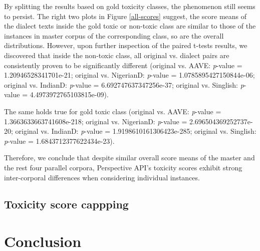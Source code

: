 \documentclass[11pt]{article}
\begin{document}
By splitting the results based on gold toxicity classes, the phenomenon still seems to persist. The right two plots in Figure \ref{all-scores} suggest, the score means of the dialect texts inside the gold toxic or non-toxic class are similar to those of the instances in master corpus of the corresponding class, so are the overall distributions. However, upon further inspection of the paired t-tests results, we discovered that inside the non-toxic class, all original vs. dialect pairs are consistently proven to be significantly different (original vs. AAVE: \textit{p}-value = 1.20946528341701e-21; original vs. NigerianD: \textit{p}-value = 1.0785895427150844e-06; original vs. IndianD: \textit{p}-value = 6.692747637347256e-37; original vs. Singlish: \textit{p}-value = 4.4973972765103815e-09).

The same holds true for gold toxic class (original vs. AAVE: \textit{p}-value = 1.3663633663741608e-218; original vs. NigerianD: \textit{p}-value = 2.696504369252737e-20; original vs. IndianD: \textit{p}-value = 1.9198610161306423e-285; original vs. Singlish: \textit{p}-value = 1.6843712377622434e-23).

Therefore, we conclude that despite similar overall score means of the master and the rest four parallel corpora, Perspective API’s toxicity scores exhibit strong inter-corporal differences when considering individual instances.

\subsection{Toxicity score cappping}
































\newpage





\section{Conclusion}
\end{document}
